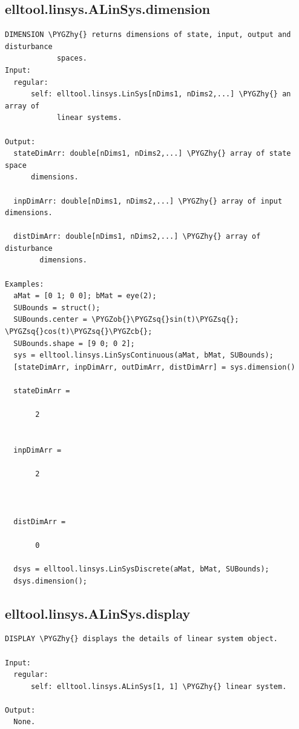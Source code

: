 \documentclass[letterpaper,10pt,english]{sphinxmanual}
\def\PYGZob{\char`\{}
\def\PYGZcb{\char`\}}
\def\PYGZhy{\char`\-}
\def\PYGZsq{\char`\'}
\begin{document}
\subsection{elltool.linsys.ALinSys.dimension}
\label{chap_functions:elltool-linsys-alinsys-dimension}
\begin{Verbatim}[commandchars=\\\{\}]
DIMENSION \PYGZhy{} returns dimensions of state, input, output and disturbance
            spaces.
Input:
  regular:
      self: elltool.linsys.LinSys[nDims1, nDims2,...] \PYGZhy{} an array of
            linear systems.

Output:
  stateDimArr: double[nDims1, nDims2,...] \PYGZhy{} array of state space
      dimensions.

  inpDimArr: double[nDims1, nDims2,...] \PYGZhy{} array of input dimensions.

  distDimArr: double[nDims1, nDims2,...] \PYGZhy{} array of disturbance
        dimensions.

Examples:
  aMat = [0 1; 0 0]; bMat = eye(2);
  SUBounds = struct();
  SUBounds.center = \PYGZob{}\PYGZsq{}sin(t)\PYGZsq{}; \PYGZsq{}cos(t)\PYGZsq{}\PYGZcb{};
  SUBounds.shape = [9 0; 0 2];
  sys = elltool.linsys.LinSysContinuous(aMat, bMat, SUBounds);
  [stateDimArr, inpDimArr, outDimArr, distDimArr] = sys.dimension()

  stateDimArr =

       2


  inpDimArr =

       2



  distDimArr =

       0

  dsys = elltool.linsys.LinSysDiscrete(aMat, bMat, SUBounds);
  dsys.dimension();
\end{Verbatim}


\subsection{elltool.linsys.ALinSys.display}
\label{chap_functions:elltool-linsys-alinsys-display}
\begin{Verbatim}[commandchars=\\\{\}]
DISPLAY \PYGZhy{} displays the details of linear system object.

Input:
  regular:
      self: elltool.linsys.ALinSys[1, 1] \PYGZhy{} linear system.

Output:
  None.
\end{Verbatim}
\end{document}
